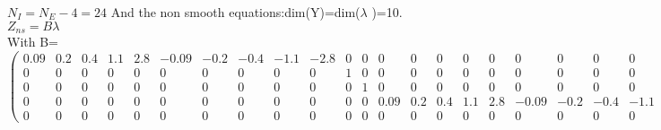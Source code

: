 $N_{I}=N_{E}-4=24$
\newpage
And the non smooth equations:dim(Y)=dim($\lambda$ )=10.\\
\underline{$Z_{ns}=B\lambda$}\\
With B=
\tiny
\[
\left(\begin{array}{cccccccccccccccccccccccc}
0.09&0.2&0.4&1.1&2.8&-0.09&-0.2&-0.4&-1.1&-2.8&0&0&0&0&0&0&0&0&0&0&0&0&0&0\\
0&0&0&0&0&0&0&0&0&0&1&0&0&0&0&0&0&0&0&0&0&0&0&0\\
0&0&0&0&0&0&0&0&0&0&0&1&0&0&0&0&0&0&0&0&0&0&0&0\\
0&0&0&0&0&0&0&0&0&0&0&0&0.09&0.2&0.4&1.1&2.8&-0.09&-0.2&-0.4&-1.1&-2.8&0&0\\
0&0&0&0&0&0&0&0&0&0&0&0&0&0&0&0&0&0&0&0&0&0&25&-25
\end{array}\right)\]

